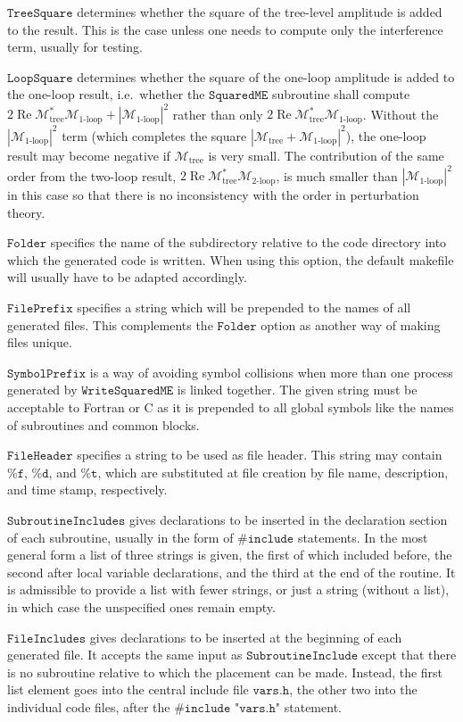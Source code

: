\documentclass[twoside,11pt]{article}
\def\Code#1{\ensuremath{\texttt{#1}}}
\def\limfunc#1{\mathop{\mathrm{#1}}}
\def\Re{\limfunc{Re}}
\def\ie{i.e.\ }
\def\M{\mathcal{M}}
\def\Mtree{\M_{\text{tree}}}
\def\Mloop{\M_{\text{1-loop}}}
\begin{document}
\Code{TreeSquare} determines whether the square of the tree-level
amplitude is added to the result.  This is the case unless one needs to
compute only the interference term, usually for testing.

\Code{LoopSquare} determines whether the square of the one-loop
amplitude is added to the one-loop result, \ie whether the
\Code{SquaredME} subroutine shall compute $2\Re\Mtree^*\Mloop +
|\Mloop|^2$ rather than only $2\Re\Mtree^*\Mloop$.  Without the
$|\Mloop|^2$ term (which completes the square $|\Mtree + \Mloop|^2$),
the one-loop result may become negative if $\Mtree$ is very small.  The
contribution of the same order from the two-loop result, $2\Re\Mtree^*
\M_{\text{2-loop}}$, is much smaller than $|\Mloop|^2$ in this case so
that there is no inconsistency with the order in perturbation theory.

\Code{Folder} specifies the name of the subdirectory relative to the
code directory into which the generated code is written.  When using
this option, the default makefile will usually have to be adapted
accordingly.

\Code{FilePrefix} specifies a string which will be prepended to the
names of all generated files.  This complements the \Code{Folder} option
as another way of making files unique.

\Code{SymbolPrefix} is a way of avoiding symbol collisions when more than
one process generated by \Code{WriteSquaredME} is linked together.  The
given string must be acceptable to Fortran or C as it is prepended to all
global symbols like the names of subroutines and common blocks.

\Code{FileHeader} specifies a string to be used as file header.  This 
string may contain \Code{\%f}, \Code{\%d}, and \Code{\%t}, which are 
substituted at file creation by file name, description, and time stamp, 
respectively.

\Code{SubroutineIncludes} gives declarations to be inserted in the 
declaration section of each subroutine, usually in the form of 
\Code{\#include} statements.  In the most general form a list of three 
strings is given, the first of which included before, the second after 
local variable declarations, and the third at the end of the routine.  
It is admissible to provide a list with fewer strings, or just a string 
(without a list), in which case the unspecified ones remain empty.

\Code{FileIncludes} gives declarations to be inserted at the beginning 
of each generated file.  It accepts the same input as 
\Code{SubroutineInclude} except that there is no subroutine relative to 
which the placement can be made.  Instead, the first list element goes 
into the central include file \Code{vars.h}, the other two into the 
individual code files, after the \Code{\#include "vars.h"} statement.
\end{document}
